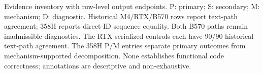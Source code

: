 \begin{table}[t]
\caption{Evidence inventory with row-level output endpoints. P: primary; S: secondary; M: mechanism; D: diagnostic. Historical M4/RTX/B570 rows report text-path agreement; 358H reports direct-ID sequence equality. Both B570 paths remain inadmissible diagnostics. The RTX serialized controls each have 90/90 historical text-path agreement. The 358H P/M entries separate primary outcomes from mechanism-supported decomposition. None establishes functional code correctness; annotations are descriptive and non-exhaustive.}
\label{tab:regimes}
\centering
\begingroup

\endgroup
\end{table}
